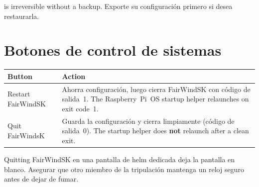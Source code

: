 \begin{warningbox}
 is irreversible without a backup.
Exporte su configuración primero si desea restaurarla.
\end{warningbox}

\section{Botones de control de sistemas}

\begin{longtable}{L{3.2cm}L{10.5cm}}
\toprule
{}
\color{white}\sffamily\bfseries Button &
\color{white}\sffamily\bfseries Action \\
\midrule
Restart FairWindSK&
Ahorra configuración, luego cierra FairWindSK con código de salida~1.
  The Raspberry~Pi~OS startup helper relaunches on exit code~1. \\
Quit FairWindsK&
Guarda la configuración y cierra limpiamente (código de salida~0).
  The startup helper does \textbf{not} relaunch after a clean exit. \\
\bottomrule
\end{longtable}

\begin{warningbox}
Quitting FairWindSK en una pantalla de helm dedicada deja la pantalla en blanco.
Asegurar que otro miembro de la tripulación mantenga un reloj seguro antes de dejar de fumar.
\end{warningbox}
